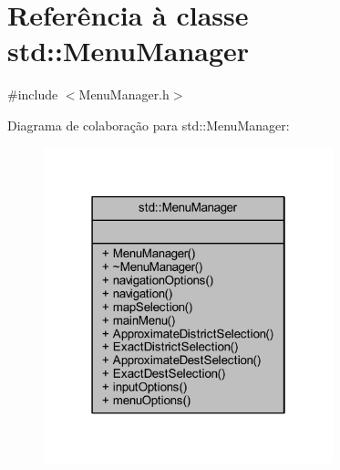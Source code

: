 \hypertarget{classstd_1_1_menu_manager}{}\section{Referência à classe std\+:\+:Menu\+Manager}
\label{classstd_1_1_menu_manager}


{\ttfamily \#include $<$Menu\+Manager.\+h$>$}



Diagrama de colaboração para std\+:\+:Menu\+Manager\+:
\nopagebreak
\begin{figure}[H]
\begin{center}
\leavevmode
\includegraphics[width=238pt]{classstd_1_1_menu_manager__coll__graph}
\end{center}
\end{figure}
